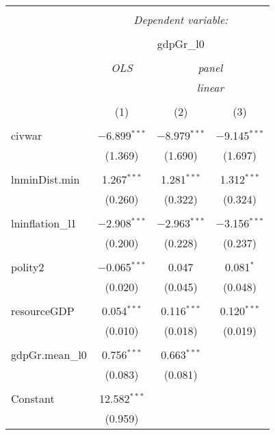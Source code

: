 
\begin{table}[!htbp] \centering 
  \caption{} 
  \label{} 
\begin{tabular}{@{\extracolsep{5pt}}lccc} 
\\[-1.8ex]\hline 
\hline \\[-1.8ex] 
 & \multicolumn{3}{c}{\textit{Dependent variable:}} \\ 
\cline{2-4} 
\\[-1.8ex] & \multicolumn{3}{c}{gdpGr\_l0} \\ 
\\[-1.8ex] & \textit{OLS} & \multicolumn{2}{c}{\textit{panel}} \\ 
 & \textit{} & \multicolumn{2}{c}{\textit{linear}} \\ 
\\[-1.8ex] & (1) & (2) & (3)\\ 
\hline \\[-1.8ex] 
 civwar & $-$6.899$^{***}$ & $-$8.979$^{***}$ & $-$9.145$^{***}$ \\ 
  & (1.369) & (1.690) & (1.697) \\ 
  & & & \\ 
 lnminDist.min & 1.267$^{***}$ & 1.281$^{***}$ & 1.312$^{***}$ \\ 
  & (0.260) & (0.322) & (0.324) \\ 
  & & & \\ 
 lninflation\_l1 & $-$2.908$^{***}$ & $-$2.963$^{***}$ & $-$3.156$^{***}$ \\ 
  & (0.200) & (0.228) & (0.237) \\ 
  & & & \\ 
 polity2 & $-$0.065$^{***}$ & 0.047 & 0.081$^{*}$ \\ 
  & (0.020) & (0.045) & (0.048) \\ 
  & & & \\ 
 resourceGDP & 0.054$^{***}$ & 0.116$^{***}$ & 0.120$^{***}$ \\ 
  & (0.010) & (0.018) & (0.019) \\ 
  & & & \\ 
 gdpGr.mean\_l0 & 0.756$^{***}$ & 0.663$^{***}$ &  \\ 
  & (0.083) & (0.081) &  \\ 
  & & & \\ 
 Constant & 12.582$^{***}$ &  &  \\ 
  & (0.959) &  &  \\ 

\end{tabular}
\end{table}
